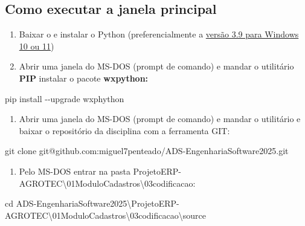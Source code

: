 \documentclass[
]{book}
\newenvironment{Shaded}{\begin{snugshade}}{\end{snugshade}}
\newcommand{\AttributeTok}[1]{\textcolor[rgb]{0.13,0.29,0.53}{#1}}
\newcommand{\BuiltInTok}[1]{#1}
\newcommand{\NormalTok}[1]{#1}
\providecommand{\tightlist}{%
  \setlength{\itemsep}{0pt}\setlength{\parskip}{0pt}}
\begin{document}
\subsection{Como executar a janela principal}\label{como-executar-a-janela-principal}

\begin{enumerate}
\def\labelenumi{\arabic{enumi}.}
\item
  Baixar o e instalar o Python (preferencialmente a \href{https://www.python.org/ftp/python/3.9.0/python-3.9.0-amd64.exe}{versão 3.9 para Windows 10 ou 11})
\item
  Abrir uma janela do MS-DOS (prompt de comando) e mandar o utilitário \textbf{PIP} instalar o pacote \textbf{wxpython:}
\end{enumerate}

\begin{Shaded}
\begin{Highlighting}[]
\NormalTok{pip install {-}}\AttributeTok{{-}upgrade}\NormalTok{ wxphython}
\end{Highlighting}
\end{Shaded}

\begin{enumerate}
\def\labelenumi{\arabic{enumi}.}
\setcounter{enumi}{2}
\tightlist
\item
  Abrir uma janela do MS-DOS (prompt de comando) e mandar o utilitário e baixar o repositório da disciplina com a ferramenta GIT:
\end{enumerate}

\begin{Shaded}
\begin{Highlighting}[]
\NormalTok{git clone git@github.com:miguel7penteado}\AttributeTok{/ADS{-}EngenhariaSoftware2025}\NormalTok{.git}
\end{Highlighting}
\end{Shaded}

\begin{enumerate}
\def\labelenumi{\arabic{enumi}.}
\setcounter{enumi}{3}
\tightlist
\item
  Pelo MS-DOS entrar na pasta ProjetoERP-AGROTEC\textbackslash01ModuloCadastros\textbackslash03codificacao\source :
\end{enumerate}

\begin{Shaded}
\begin{Highlighting}[]
\BuiltInTok{cd}\NormalTok{ ADS{-}EngenhariaSoftware2025\textbackslash{}ProjetoERP{-}AGROTEC\textbackslash{}01ModuloCadastros\textbackslash{}03codificacao\textbackslash{}source}
\end{Highlighting}
\end{Shaded}
\end{document}
